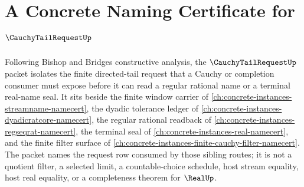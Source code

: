 \chapter{A Concrete Naming Certificate for $\CauchyTailRequestUp$}
\label{ch:concrete-instances-cauchy-tail-request-namecert}

Following Bishop and Bridges constructive analysis, the $\CauchyTailRequestUp$ packet isolates the finite directed-tail request that a Cauchy or completion consumer must expose before it can read a regular rational name or a terminal real-name seal. It sits beside the finite window carrier of \autoref{ch:concrete-instances-streamname-namecert}, the dyadic tolerance ledger of \autoref{ch:concrete-instances-dyadicratcore-namecert}, the regular rational readback of \autoref{ch:concrete-instances-regseqrat-namecert}, the terminal seal of \autoref{ch:concrete-instances-real-namecert}, and the finite filter surface of \autoref{ch:concrete-instances-finite-cauchy-filter-namecert}. The packet names the request row consumed by those sibling routes; it is not a quotient filter, a selected limit, a countable-choice schedule, host stream equality, host real equality, or a completeness theorem for $\RealUp$.

